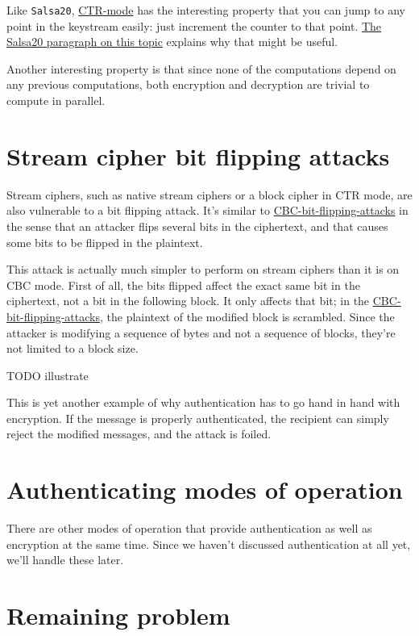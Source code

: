 \documentclass[11pt,ebook,table,dvipsnames]{memoir}
\begin{document}
Like \texttt{Salsa20}, \hyperref[CTR mode]{CTR-mode} has the interesting property that you can jump
to any point in the keystream easily: just increment the counter to
that point. \hyperref[keystream-jump]{The Salsa20 paragraph on this topic} explains why that
might be useful.

Another interesting property is that since none of the computations
depend on any previous computations, both encryption and decryption
are trivial to compute in parallel.
\section{Stream cipher bit flipping attacks}
\label{sec-2-3-13}

Stream ciphers, such as native stream ciphers or a block cipher in
\gls{CTR mode}, are also vulnerable to a bit flipping attack. It's
similar to \hyperref[CBC bit flipping attacks]{CBC-bit-flipping-attacks} in the sense that an attacker
flips several bits in the ciphertext, and that causes some bits to be
flipped in the plaintext.

This attack is actually much simpler to perform on stream ciphers than
it is on \gls{CBC mode}. First of all, the bits flipped affect the
exact same bit in the ciphertext, not a bit in the following block. It
only affects that bit; in the \hyperref[CBC bit flipping attacks]{CBC-bit-flipping-attacks}, the plaintext
of the modified block is scrambled. Since the attacker is modifying a
sequence of bytes and not a sequence of blocks, they're not limited to
a block size.

TODO illustrate

This is yet another example of why authentication has to go hand in
hand with encryption. If the message is properly authenticated, the
recipient can simply reject the modified messages, and the attack is
foiled.
\section{Authenticating modes of operation}
\label{sec-2-3-14}

There are other modes of operation that provide authentication as
well as encryption at the same time. Since we haven't discussed
authentication at all yet, we'll handle these later.
\section{Remaining problem}
\label{sec-2-3-15}
\end{document}
